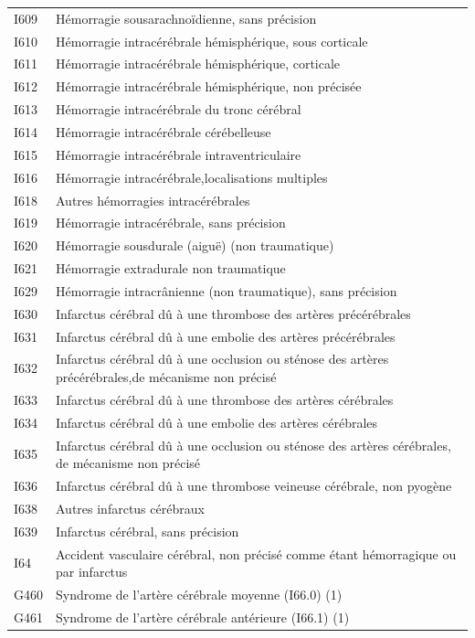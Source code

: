 \documentclass[12pt,english,french,twoside]{book}\usepackage[]{graphicx}\usepackage[]{color}
\begin{document}
{\begin{longtable}{|l|l|}
 I609 & Hémorragie sousarachnoïdienne, sans précision \\
 I610 & Hémorragie intracérébrale hémisphérique, sous corticale \\
 I611 & Hémorragie intracérébrale hémisphérique, corticale \\
 I612 & Hémorragie intracérébrale hémisphérique, non précisée \\
 I613 & Hémorragie intracérébrale du tronc cérébral \\
 I614 & Hémorragie intracérébrale cérébelleuse \\
 I615 & Hémorragie intracérébrale intraventriculaire \\
 I616 & Hémorragie intracérébrale,localisations multiples \\
 I618 & Autres hémorragies intracérébrales \\
 I619 & Hémorragie intracérébrale, sans précision \\
 I620 & Hémorragie sousdurale (aiguë) (non traumatique) \\
 I621 & Hémorragie extradurale non traumatique \\
 I629 & Hémorragie intracrânienne (non traumatique), sans précision \\
 I630 & Infarctus cérébral dû à une thrombose des artères précérébrales \\
 I631 & Infarctus cérébral dû à une embolie des artères précérébrales \\
 I632 & Infarctus cérébral dû à une occlusion ou sténose des artères précérébrales,de mécanisme non précisé \\
 I633 & Infarctus cérébral dû à une thrombose des artères cérébrales \\
 I634 & Infarctus cérébral dû à une embolie des artères cérébrales \\
 I635 & Infarctus cérébral dû à une occlusion ou sténose des artères cérébrales, de mécanisme non précisé \\
 I636 & Infarctus cérébral dû à une thrombose veineuse cérébrale, non pyogène \\
 I638 & Autres infarctus cérébraux \\
 I639 & Infarctus cérébral, sans précision \\
 I64 & Accident vasculaire cérébral, non précisé comme étant hémorragique ou par infarctus \\
 G460 & Syndrome de l'artère cérébrale moyenne (I66.0) (1) \\
 G461 & Syndrome de l'artère cérébrale antérieure (I66.1) (1) \\

\end{longtable}}
\end{document}
